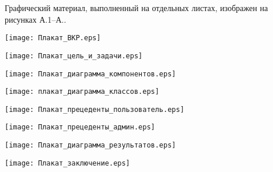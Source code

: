 
Графический материал, выполненный на отдельных листах,
изображен на рисунках А.1--А..
\setcounter{числоПлакатов}{0}

\renewcommand{\thefigure}{А.\arabic{figure}} %

\begin{landscape}

\begin{плакат}
    \texttt{[image: Плакат\_ВКР.eps]}
    \label{pl1:image}      
\end{плакат}

\begin{плакат}
    \texttt{[image: Плакат\_цель\_и\_задачи.eps]}
    \label{pl2:image}      
\end{плакат}

\begin{плакат}
    \texttt{[image: Плакат\_диаграмма\_компонентов.eps]}
    \label{pl3:image}      
\end{плакат}

\begin{плакат}
    \texttt{[image: плакат\_диаграмма\_классов.eps]}
    \label{pl4:image}      
\end{плакат}

\begin{плакат}
	\texttt{[image: Плакат\_прецеденты\_пользователь.eps]}
	\label{pl4:image}      
\end{плакат}

\begin{плакат}
	\texttt{[image: Плакат\_прецеденты\_админ.eps]}
	\label{pl4:image}      
\end{плакат}

\begin{плакат}
	\texttt{[image: Плакат\_диаграмма\_результатов.eps]}
	\label{pl4:image}      
\end{плакат}

\begin{плакат}
	\texttt{[image: Плакат\_заключение.eps]}
	\label{pl4:image}      
\end{плакат}

\end{landscape}
